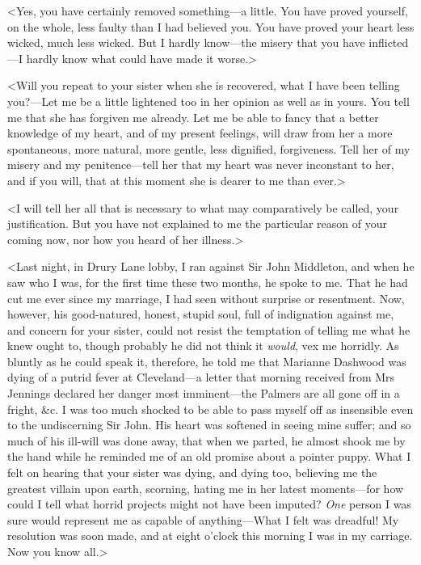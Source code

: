 <Yes, you have certainly removed something—a little. You have proved yourself, on the whole, less faulty than I had believed you. You have proved your heart less wicked, much less wicked. But I hardly know—the misery that you have inflicted—I hardly know what could have made it worse.>

<Will you repeat to your sister when she is recovered, what I have been telling you?—Let me be a little lightened too in her opinion as well as in yours. You tell me that she has forgiven me already. Let me be able to fancy that a better knowledge of my heart, and of my present feelings, will draw from her a more spontaneous, more natural, more gentle, less dignified, forgiveness. Tell her of my misery and my penitence—tell her that my heart was never inconstant to her, and if you will, that at this moment she is dearer to me than ever.>

<I will tell her all that is necessary to what may comparatively be called, your justification. But you have not explained to me the particular reason of your coming now, nor how you heard of her illness.>

<Last night, in Drury Lane lobby, I ran against Sir John Middleton, and when he saw who I was, for the first time these two months, he spoke to me. That he had cut me ever since my marriage, I had seen without surprise or resentment. Now, however, his good-natured, honest, stupid soul, full of indignation against me, and concern for your sister, could not resist the temptation of telling me what he knew ought to, though probably he did not think it \textit{would}, vex me horridly. As bluntly as he could speak it, therefore, he told me that Marianne Dashwood was dying of a putrid fever at Cleveland—a letter that morning received from Mrs Jennings declared her danger most imminent—the Palmers are all gone off in a fright, \&c. I was too much shocked to be able to pass myself off as insensible even to the undiscerning Sir John. His heart was softened in seeing mine suffer; and so much of his ill-will was done away, that when we parted, he almost shook me by the hand while he reminded me of an old promise about a pointer puppy. What I felt on hearing that your sister was dying, and dying too, believing me the greatest villain upon earth, scorning, hating me in her latest moments—for how could I tell what horrid projects might not have been imputed? \textit{One} person I was sure would represent me as capable of anything—What I felt was dreadful! My resolution was soon made, and at eight o'clock this morning I was in my carriage. Now you know all.>

